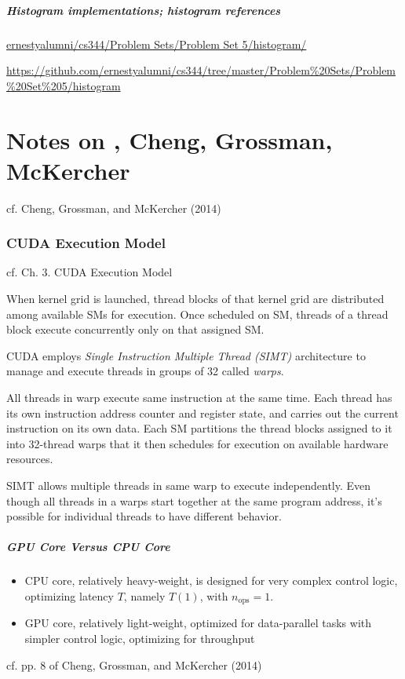 \documentclass[10pt]{amsart}
\begin{document}
\begin{multicols*}{2}
\subsubsection{Histogram implementations; histogram references}

\href{https://github.com/ernestyalumni/cs344/tree/master/Problem%20Sets/Problem%20Set%205/histogram}{ernestyalumni/cs344/Problem Sets/Problem Set 5/histogram/}

  \url{https://github.com/ernestyalumni/cs344/tree/master/Problem%20Sets/Problem%20Set%205/histogram}




\part{Notes on , Cheng, Grossman, McKercher}
cf. Cheng, Grossman, and McKercher (2014) \cite{CGM2014}
\section{CUDA Execution Model}
cf. Ch. 3.  CUDA Execution Model 

When kernel grid is launched, thread blocks of that kernel grid are distributed among available SMs for execution.  Once scheduled on SM, threads of a thread block execute concurrently only on that assigned SM.  

CUDA employs \emph{Single Instruction Multiple Thread (SIMT)} architecture to manage and execute threads in groups of 32 called \emph{warps}.  

All threads in warp execute same instruction at the same time.  Each thread has its own instruction address counter and register state, and carries out the current instruction on its own data.  Each SM partitions the thread blocks assigned to it into 32-thread warps that it then schedules for execution on available hardware resources.  

SIMT allows multiple threads in same warp to execute independently.  Even though all threads in a warps start together at the same program address, it's possible for individual threads to have different behavior.  


\subsubsection{GPU Core Versus CPU Core}  

\begin{itemize}
	\item CPU core, relatively heavy-weight, is designed for very complex control logic, optimizing latency $T$, namely $T(1)$, with $n_{\text{ops}}=1$.  
	\item GPU core, relatively light-weight, optimized for data-parallel tasks with simpler control logic, optimizing for throughput   
\end{itemize}
cf. pp. 8 of Cheng, Grossman, and McKercher (2014) \cite{CGM2014}


\end{multicols*}
\end{document}
